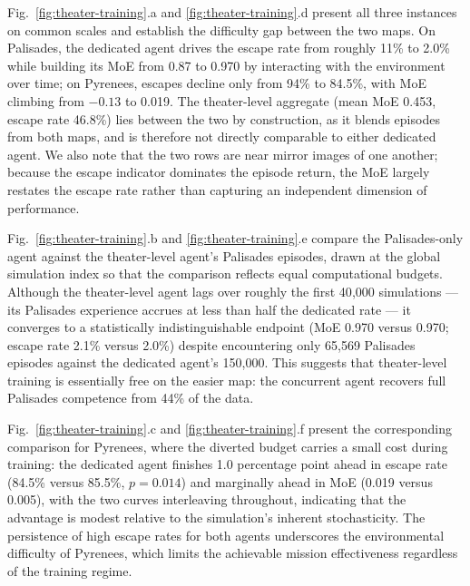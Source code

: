 Fig.~\ref{fig:theater-training}.a and \ref{fig:theater-training}.d present
all three instances on common scales and establish the difficulty gap between
the two maps. On Palisades, the dedicated agent drives the escape rate from
roughly 11\% to 2.0\% while building its MoE from 0.87 to 0.970 by
interacting with the environment over time; on Pyrenees, escapes decline only
from 94\% to 84.5\%, with MoE climbing from $-0.13$ to 0.019. The
theater-level aggregate (mean MoE 0.453, escape rate 46.8\%) lies between the
two by construction, as it blends episodes from both maps, and is therefore
not directly comparable to either dedicated agent. We also note that the two
rows are near mirror images of one another; because the escape indicator
dominates the episode return, the MoE largely restates the escape rate rather
than capturing an independent dimension of performance.

Fig.~\ref{fig:theater-training}.b and \ref{fig:theater-training}.e compare
the Palisades-only agent against the theater-level agent's Palisades
episodes, drawn at the global simulation index so that the comparison
reflects equal computational budgets. Although the theater-level agent lags
over roughly the first 40{,}000 simulations --- its Palisades experience
accrues at less than half the dedicated rate --- it converges to a
statistically indistinguishable endpoint (MoE 0.970 versus 0.970; escape rate
2.1\% versus 2.0\%) despite encountering only 65{,}569 Palisades episodes
against the dedicated agent's 150{,}000. This suggests that theater-level
training is essentially free on the easier map: the concurrent agent recovers
full Palisades competence from 44\% of the data.

Fig.~\ref{fig:theater-training}.c and \ref{fig:theater-training}.f present
the corresponding comparison for Pyrenees, where the diverted budget carries
a small cost during training: the dedicated agent finishes 1.0 percentage
point ahead in escape rate (84.5\% versus 85.5\%, $p = 0.014$) and marginally
ahead in MoE (0.019 versus 0.005), with the two curves interleaving
throughout, indicating that the advantage is modest relative to the
simulation's inherent stochasticity. The persistence of high escape rates for
both agents underscores the environmental difficulty of Pyrenees, which
limits the achievable mission effectiveness regardless of the training
regime.

